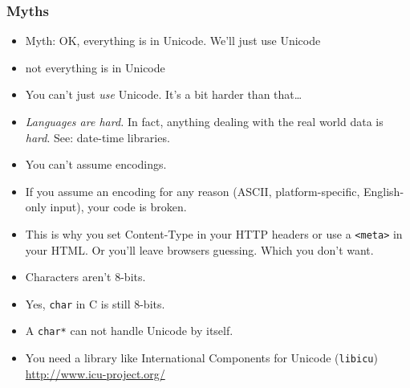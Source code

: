 \documentclass[%
        hyperref={%
                pdfauthor={Zakariyya Mughal},%
                pdfpagemode={None},pdfpagelayout={SinglePage}}%
        xcolor={x11names},%
]{beamer}
\begin{document}
\begin{frame}
\frametitle{Myths}
\begin{itemize}
\frametitle{Myths}
\item Myth: OK, everything is in Unicode. We'll just use Unicode
\pause\item not everything is in Unicode
\pause\item You can't just \emph{use} Unicode. It's a bit harder than that\ldots
\pause\item \quad\emph{Languages are hard.} \pause In fact, anything
dealing with the real world data is \emph{hard}. See: date-time libraries.
\end{itemize}
\end{frame}


\begin{frame}
\begin{itemize}
\item You can't assume encodings.
\pause\item If you assume an encoding for any reason (ASCII,
platform-specific, English-only input), your code is broken.
\pause\item This is why you set Content-Type in your HTTP headers
or use a \texttt{<meta>} in your HTML. \pause Or you'll leave
browsers guessing. Which you don't want.
\end{itemize}
\end{frame}

\begin{frame}
\begin{itemize}
\item Characters aren't 8-bits.
\pause\item Yes, \texttt{char} in C is still 8-bits.
\pause\item A \texttt{char*} can not handle Unicode by itself.
\pause\item You need a library like International Components for
Unicode (\texttt{libicu}) \url{http://www.icu-project.org/}
\end{itemize}
\end{frame}
\end{document}
